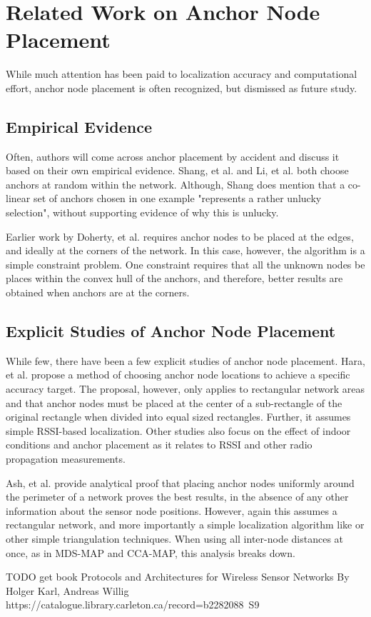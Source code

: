\chapter{Related Work on Anchor Node Placement}

While much attention has been paid to localization accuracy and computational effort, anchor node placement is often recognized, but dismissed as future study.   

\section{Empirical Evidence}

Often, authors will come across anchor placement by accident and discuss it based on their own empirical evidence.  Shang, et al.\cite[p. 964]{MDS-MAP} and Li, et al.\cite[p. 11]{CCA-MAP07} both choose anchors at random within the network.  Although, Shang does mention that a co-linear set of anchors chosen in one example "represents a rather unlucky selection", without supporting evidence of why this is unlucky.

Earlier work by Doherty, et al.\cite{Doherty} requires anchor nodes to be placed at the edges, and ideally at the corners of the network.  In this case, however, the algorithm is a simple constraint problem.  One constraint requires that all the unknown nodes be places within the convex hull of the anchors, and therefore, better results are obtained when anchors are at the corners.

\section{Explicit Studies of Anchor Node Placement}
While few, there have been a few explicit studies of anchor node placement.  Hara, et al.\cite{Hara} propose a method of choosing anchor node locations to achieve a specific accuracy target.  The proposal, however, only applies to rectangular network areas and that anchor nodes must be placed at the center of a sub-rectangle of the original rectangle when divided into equal sized rectangles.  Further, it assumes simple RSSI-based localization.  Other studies also focus on the effect of indoor conditions and anchor placement as it relates to RSSI and other radio propagation measurements\cite{Zemek}.

Ash, et al.\cite{Ash} provide analytical proof that placing anchor nodes uniformly around the perimeter of a network proves the best results, in the absence of any other information about the sensor node positions. However, again this assumes a rectangular network, and more importantly a simple localization algorithm like \cite{Doherty} or other simple triangulation techniques.  When using all inter-node distances at once, as in MDS-MAP and CCA-MAP, this analysis breaks down.

TODO get book Protocols and Architectures for Wireless Sensor Networks By Holger Karl, Andreas Willig
https://catalogue.library.carleton.ca/record=b2282088~S9

